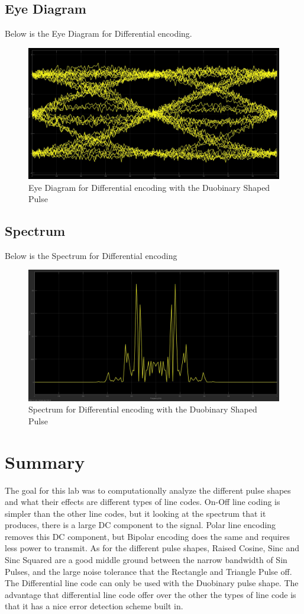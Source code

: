 \documentclass{article}
\begin{document}
\subsection{Eye Diagram}
Below is the Eye Diagram for Differential encoding.
\begin{figure}[H]
  \includegraphics[width = \linewidth]{DuoBinary_Eye.jpg}
  \caption{Eye Diagram for Differential encoding with the Duobinary Shaped Pulse}
  \label{fig:DuoBinary-Eye}
  \end{figure}
\subsection{Spectrum}
Below is the Spectrum for Differential encoding
\begin{figure}[H]
  \includegraphics[width = \linewidth]{DuoBinary_Spectrum.jpg}
  \caption{Spectrum for Differential encoding with the Duobinary Shaped Pulse}
  \label{fig:DuoBinary-Spectrum}
\end{figure}
\section{Summary}
The goal for this lab was to computationally analyze the different pulse shapes and what their effects are different types of line codes. On-Off line coding is simpler than the other line codes, but it looking at the spectrum that it produces, there is a large DC component to the signal. Polar line encoding removes this DC component, but Bipolar encoding does the same and requires less power to transmit. As for the different pulse shapes, Raised Cosine, Sinc and Sinc Squared are a good middle ground between the narrow bandwidth of Sin Pulses, and the large noise tolerance that the Rectangle and Triangle Pulse off. The Differential line code can only be used with the Duobinary pulse shape. The advantage that differential line code offer over the other the types of line code is that it has a nice error detection scheme built in.
\end{document}
